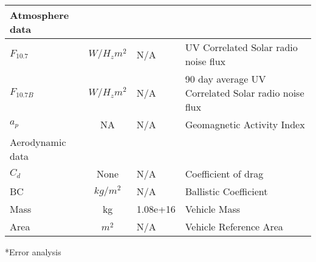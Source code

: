 \begin{table}[htb]
\begin{center}
{\begin{tabular}{|l|c|l|l|}
Atmosphere data   &            &          &      \\ \hline \hline
$F_{10.7}$        & $W/{H_z}{m^2}$    &   N/A    & UV Correlated Solar radio noise flux             \\ \hline
$F_{10.7B}$       & $W/{H_z}{m^2}$    &   N/A    &  90 day average UV Correlated Solar radio noise flux  \\ \hline
$a_p$            &  NA                &   N/A    &  Geomagnetic Activity Index                \\ \hline \hline
Aerodynamic data         &      &      &      \\ \hline \hline
$C_d$                    &None       &  N/A         & Coefficient of drag \\ \hline
BC                       &$kg/m^2$   &  N/A          & Ballistic Coefficient \\ \hline
Mass                     &kg         &  1.08e+16            & Vehicle Mass           \\ \hline
Area                     &$m^2$      &  N/A             & Vehicle Reference Area  \\ \hline
\end{tabular}}
\end{center}
\end{table}
*Error analysis \cite{JPL}
\clearpage
